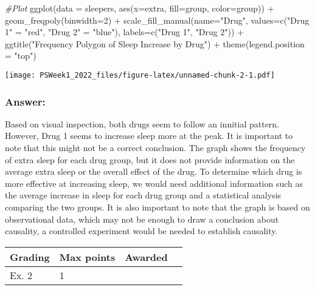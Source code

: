 \documentclass[
]{article}
\newenvironment{Shaded}{\begin{snugshade}}{\end{snugshade}}
\newcommand{\AttributeTok}[1]{\textcolor[rgb]{0.77,0.63,0.00}{#1}}
\newcommand{\CommentTok}[1]{\textcolor[rgb]{0.56,0.35,0.01}{\textit{#1}}}
\newcommand{\DecValTok}[1]{\textcolor[rgb]{0.00,0.00,0.81}{#1}}
\newcommand{\FunctionTok}[1]{\textcolor[rgb]{0.00,0.00,0.00}{#1}}
\newcommand{\NormalTok}[1]{#1}
\newcommand{\OtherTok}[1]{\textcolor[rgb]{0.56,0.35,0.01}{#1}}
\newcommand{\SpecialCharTok}[1]{\textcolor[rgb]{0.00,0.00,0.00}{#1}}
\newcommand{\StringTok}[1]{\textcolor[rgb]{0.31,0.60,0.02}{#1}}
\begin{document}
\begin{Shaded}
\begin{Highlighting}[]
\CommentTok{\#Plot}
\FunctionTok{ggplot}\NormalTok{(}\AttributeTok{data =}\NormalTok{ sleepers, }\FunctionTok{aes}\NormalTok{(}\AttributeTok{x=}\NormalTok{extra, }\AttributeTok{fill=}\NormalTok{group, }\AttributeTok{color=}\NormalTok{group)) }\SpecialCharTok{+} 
  \FunctionTok{geom\_freqpoly}\NormalTok{(}\AttributeTok{binwidth=}\DecValTok{2}\NormalTok{) }\SpecialCharTok{+}
  \FunctionTok{scale\_fill\_manual}\NormalTok{(}\AttributeTok{name=}\StringTok{"Drug"}\NormalTok{, }\AttributeTok{values=}\FunctionTok{c}\NormalTok{(}\StringTok{"Drug 1"} \OtherTok{=} \StringTok{"red"}\NormalTok{, }\StringTok{"Drug 2"} \OtherTok{=} \StringTok{"blue"}\NormalTok{), }\AttributeTok{labels=}\FunctionTok{c}\NormalTok{(}\StringTok{"Drug 1"}\NormalTok{, }\StringTok{"Drug 2"}\NormalTok{)) }\SpecialCharTok{+}
  \FunctionTok{ggtitle}\NormalTok{(}\StringTok{"Frequency Polygon of Sleep Increase by Drug"}\NormalTok{) }\SpecialCharTok{+}
  \FunctionTok{theme}\NormalTok{(}\AttributeTok{legend.position =} \StringTok{"top"}\NormalTok{)}
\end{Highlighting}
\end{Shaded}

\texttt{[image: PSWeek1\_2022\_files/figure-latex/unnamed-chunk-2-1.pdf]}

\hypertarget{answer}{%
\subsubsection{Answer:}\label{answer}}

Based on visual inspection, both drugs seem to follow an innitial
pattern. However, Drug 1 seems to increase sleep more at the peak. It is
important to note that this might not be a correct conclusion. The graph
shows the frequency of extra sleep for each drug group, but it does not
provide information on the average extra sleep or the overall effect of
the drug. To determine which drug is more effective at increasing sleep,
we would need additional information such as the average increase in
sleep for each drug group and a statistical analysis comparing the two
groups. It is also important to note that the graph is based on
observational data, which may not be enough to draw a conclusion about
causality, a controlled experiment would be needed to establish
causality.

\begin{longtable}[]{@{}llll@{}}
\toprule()
Grading & Max points & Awarded & \\
\midrule()
\endhead
Ex. 2 & 1 & & \\
\bottomrule()
\end{longtable}
\end{document}
